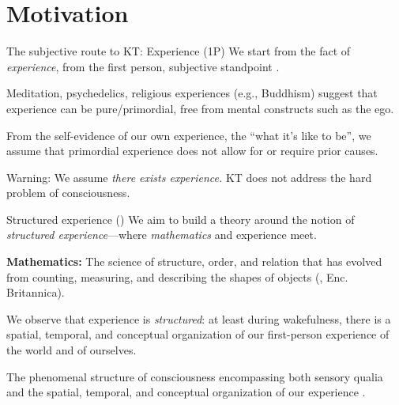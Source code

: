 




\section{Motivation}

\begin{frame}[label=intro]{The subjective route to KT: Experience (1P)}
	We start from the fact of {\em experience}, from the first person, subjective standpoint \citep{Ruffini2017}.  \vfill
	
	Meditation, psychedelics, religious experiences (e.g., Buddhism) suggest that experience can be pure/primordial, free from mental constructs such as the ego.\vfill
	
	From the self-evidence of our own experience, the ``what it's like to be'', we assume that  primordial experience does not  allow for or require prior causes.\vfill
	
    \begin{alertblock}{Warning:  We assume {\em there exists experience.} } 
	KT does not address the hard problem of consciousness.  
	\end{alertblock}
	

\end{frame}

\begin{frame}[label=intro2]{Structured experience (\SEP)}
 We aim to build a theory around the notion of 
{\em structured experience}---where {\em mathematics} and experience meet.  \vfill

{\bf Mathematics:}  The science of structure, order, and relation that has evolved from counting, measuring, and describing the shapes of objects (\cite{gray_2010}, Enc. Britannica).  \vfill

We observe that  experience is {\em structured}: at least during wakefulness, there is a spatial, temporal, and conceptual organization of our first-person experience of the world and of ourselves. \vfill

	\begin{definition}
The phenomenal structure of consciousness  encompassing both sensory qualia and the spatial, temporal, and conceptual organization of our experience  \citep{VanGulick:2016aa}. 
	\end{definition}

	

\end{frame}

